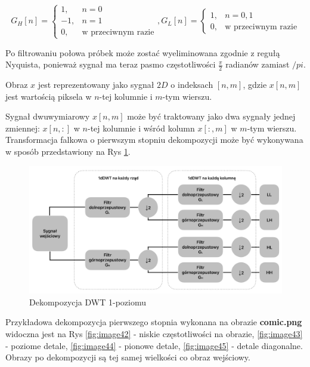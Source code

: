 \begin{equation*}
    G_H[n]=\left\{\begin{array}{ll}
    1, & n=0 \\
    -1, & n=1 \\
    0, & \text {w przeciwnym razie}
    \end{array}, 
    G_L[n]= \begin{cases}1, & n=0,1 \\
    0, & \text {w przeciwnym razie}\end{cases}\right.
\end{equation*}

Po filtrowaniu połowa próbek może zostać wyeliminowana zgodnie z regułą Nyquista, ponieważ sygnał ma teraz pasmo częstotliwości $\frac{\pi}{2}$ radianów zamiast $/pi$.

Obraz $x$ jest reprezentowany jako sygnał $2 D$ o indeksach $[n,m]$, gdzie $x[n,m]$ jest wartością piksela w $n$-tej kolumnie i $m$-tym wierszu.

Sygnał dwuwymiarowy $x[n,m]$ może być traktowany jako dwa sygnały jednej zmiennej: $x[n,:]$ w $n$-tej kolumnie i wśród kolumn $x[:,m]$ w $m$-tym wierszu. Transformacja falkowa o pierwszym stopniu dekompozycji może być wykonywana w sposób przedstawiony na Rys \ref{fig:image41}.

\begin{figure}[ht]
    \centering
    \begin{minipage}[t]{0.6\linewidth}
        \includegraphics[width=\linewidth]{Rozdziały/02.Podstawy_teoretyczne/Obrazy/DWT_dekompozycja.png}
        \caption{Dekompozycja DWT 1-poziomu}
        \label{fig:image41}
    \end{minipage}
\end{figure}

Przykładowa dekompozycja pierwszego stopnia wykonana na obrazie \textbf{comic.png} widoczna jest na Rys \ref{fig:image42} - niskie częstotliwości na obrazie, \ref{fig:image43} - poziome detale, \ref{fig:image44} - pionowe detale, \ref{fig:image45} - detale diagonalne. Obrazy po dekompozycji są tej samej wielkości co obraz wejściowy. 

